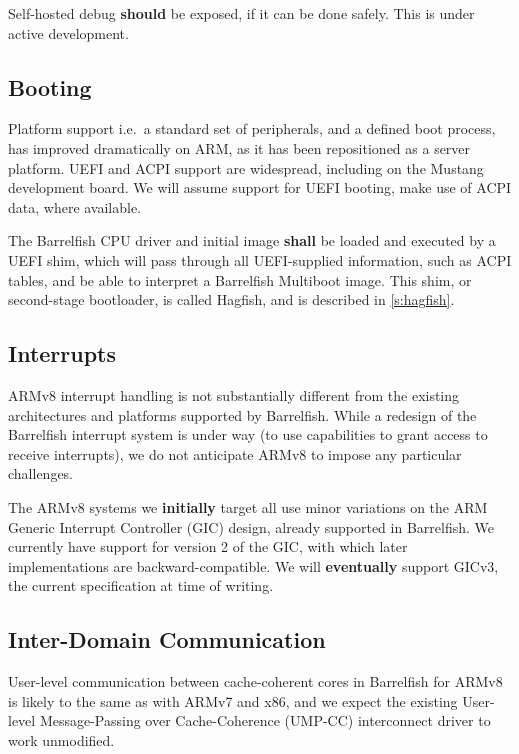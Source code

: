 \documentclass[a4paper,twoside]{report}
\begin{document}
Self-hosted debug \textbf{should} be exposed, if it can be done safely. This
is under active development.

\subsection{Booting}

Platform support i.e.~a standard set of peripherals, and a defined boot
process, has improved dramatically on ARM, as it has been repositioned as a
server platform. UEFI and ACPI support are widespread, including on the
Mustang development board. We will assume support for UEFI booting, make use
of ACPI data, where available.

The Barrelfish CPU driver and initial image \textbf{shall} be loaded and
executed by a UEFI shim, which will pass through all UEFI-supplied
information, such as ACPI tables, and be able to interpret a Barrelfish
Multiboot image.  This shim, or second-stage bootloader, is called Hagfish,
and is described in \autoref{s:hagfish}.

\subsection{Interrupts}

ARMv8 interrupt handling is not substantially different from the existing
architectures and platforms supported by Barrelfish. While a redesign of the
Barrelfish interrupt system is under way (to use capabilities to grant access
to receive interrupts), we do not anticipate ARMv8 to impose any particular
challenges.

The ARMv8 systems we \textbf{initially} target all use minor variations on the
ARM Generic Interrupt Controller (GIC) design, already supported in
Barrelfish. We currently have support for version 2 of the GIC, with which
later implementations are backward-compatible. We will \textbf{eventually}
support GICv3, the current specification at time of writing.

\subsection{Inter-Domain Communication}

User-level communication between cache-coherent cores in Barrelfish for ARMv8
is likely to the same as with ARMv7 and x86, and we expect the existing
User-level Message-Passing over Cache-Coherence (UMP-CC) interconnect driver
to work unmodified.
\end{document}
